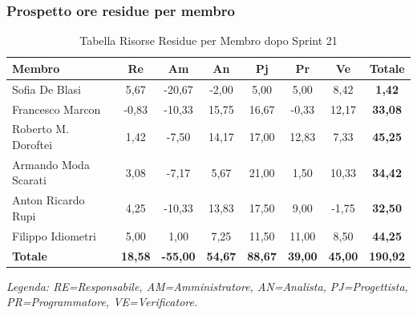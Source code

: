 \subsubsection{Prospetto ore residue per membro}
\begin{table}[H]
    \centering
    \renewcommand{\arraystretch}{1.3}
    \begin{tabularx}{\textwidth}{|X|c|c|c|c|c|c|c|}
        \hline
        \textbf{Membro} & \textbf{Re} & \textbf{Am} & \textbf{An} &
        \textbf{Pj} & \textbf{Pr} & \textbf{Ve} & \textbf{Totale} \\
        \hline
        Sofia De Blasi       &  5,67 & -20,67 &  -2,00 &  5,00 &  5,00 &  8,42 & \textbf{1,42} \\
        Francesco Marcon     & -0,83 & -10,33 &  15,75 & 16,67 & -0,33 & 12,17 & \textbf{33,08} \\
        Roberto M. Doroftei  &  1,42 &  -7,50 &  14,17 & 17,00 & 12,83 &  7,33 & \textbf{45,25} \\
        Armando Moda Scarati &  3,08 &  -7,17 &   5,67 & 21,00 &  1,50 & 10,33 & \textbf{34,42} \\
        Anton Ricardo Rupi   &  4,25 & -10,33 &  13,83 & 17,50 &  9,00 & -1,75 & \textbf{32,50} \\
        Filippo Idiometri    &  5,00 &   1,00 &   7,25 & 11,50 & 11,00 &  8,50 & \textbf{44,25} \\
        \hline
        \textbf{Totale} &
        \textbf{18,58} & \textbf{-55,00} & \textbf{54,67} &
        \textbf{88,67} & \textbf{39,00} & \textbf{45,00} &
        \textbf{190,92} \\
        \hline
    \end{tabularx}
    \begin{minipage}{\textwidth}
        \smallskip
        \footnotesize\textit{Legenda: RE=Responsabile, AM=Amministratore,
        AN=Analista, PJ=Progettista, PR=Programmatore, VE=Verificatore.}
    \end{minipage}
    \caption{Tabella Risorse Residue per Membro dopo Sprint 21}
\end{table}

